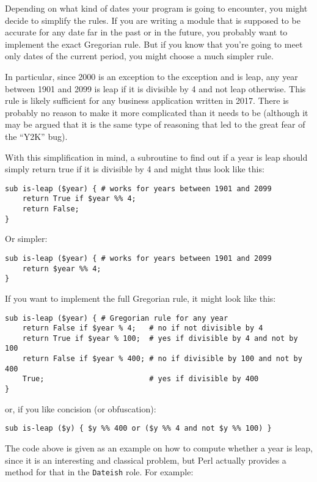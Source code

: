 Depending on what kind of dates your program is going to 
encounter, you might decide to simplify the rules. If 
you are writing a module that is supposed to be accurate for any 
date far in the past or in the future, you probably want 
to implement the exact Gregorian rule. But if you know 
that you're going to meet only dates of the current 
period, you might choose a much simpler rule.

In particular, since 2000 is an exception to the exception 
and is leap, any year between 1901 and 2099 is leap if it 
is divisible by 4 and not leap otherwise. This rule is 
likely sufficient for any business application 
written in 2017. There is probably no reason to make it 
more complicated than it needs to be (although it may be 
argued that it is the same type of reasoning that led to 
the great fear of the ``Y2K'' bug). 

With this simplification in mind, a subroutine to find out 
if a year is leap should simply return true if it is 
divisible by 4 and might thus look like this:

\begin{verbatim}
sub is-leap ($year) { # works for years between 1901 and 2099
    return True if $year %% 4; 
    return False;
}
\end{verbatim}

Or simpler:

\begin{verbatim}
sub is-leap ($year) { # works for years between 1901 and 2099
    return $year %% 4; 
}
\end{verbatim}

If you want to implement the full Gregorian rule, it might 
look like this:

\begin{verbatim}
sub is-leap ($year) { # Gregorian rule for any year
    return False if $year % 4;   # no if not divisible by 4
    return True if $year % 100;  # yes if divisible by 4 and not by 100
    return False if $year % 400; # no if divisible by 100 and not by 400
    True;                        # yes if divisible by 400
}
\end{verbatim}

or, if you like concision (or obfuscation):
\begin{verbatim}
sub is-leap ($y) { $y %% 400 or ($y %% 4 and not $y %% 100) }
\end{verbatim}

The code above is given as an example on how to compute 
whether a year is leap, since it is an interesting and 
classical problem, but Perl actually provides a method for that 
in the {\tt Dateish} role. For example:

